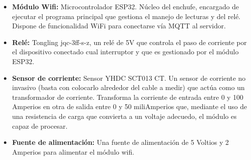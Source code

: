 \documentclass[a4paper,10pt]{article}
\begin{document}
\begin{itemize}
\item{\textbf{Módulo Wifi:} Microcontrolador
  ESP32\cite{ESP32SeriesDatasheet}. Núcleo del enchufe, encargado de
  ejecutar el programa principal que gestiona el manejo de lecturas y
  del relé. Dispone de funcionalidad WiFi para conectarse vía MQTT al
  servidor.}

\item{\textbf{Relé:} Tongling jqc-3ff-s-z, un relé de 5V que controla
  el paso de corriente por el dispositivo conectado cual interruptor y
  que es gestionado por el módulo ESP32.}

\item{\textbf{Sensor de corriente:} Sensor YHDC SCT013 CT. Un
  sensor de corriente no invasivo (basta con colocarlo alrededor del
  cable a medir) que actúa como un transformador de
  corriente. Transforma la corriente de entrada entre 0 y 100 Amperios
  en otra de salida entre 0 y 50 miliAmperios que, mediante el uso de
  una resistencia de carga que convierta a un voltaje adecuedo, el
  módulo es capaz de procesar.}

\item{\textbf{Fuente de alimentación:} Una fuente de alimentación de
  5 Voltios y 2 Amperios para alimentar el módulo wifi.}
\end{itemize}
\newpage


 
\end{document}
